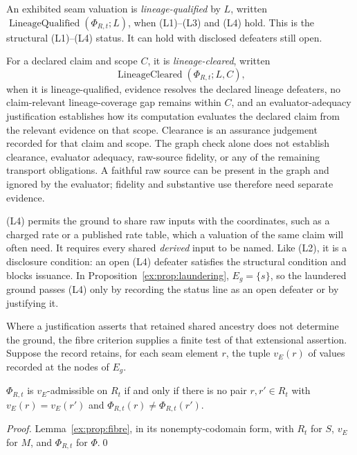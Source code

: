 \documentclass[twocolumn,envcountsect,envcountsame,natbib]{svjour3}
\begin{document}
\begin{definition}\label{ex:def:lineage-qualified}
An exhibited seam valuation is \emph{lineage-qualified} by $L$, written $\operatorname{LineageQualified}(\Phi_{R,t};L)$, when (L1)--(L3) and (L4) hold. This is the structural (L1)--(L4) status. It can hold with disclosed defeaters still open.

For a declared claim and scope $C$, it is \emph{lineage-cleared}, written
\[
\operatorname{LineageCleared}(\Phi_{R,t};L,C),
\]
when it is lineage-qualified, evidence resolves the declared lineage defeaters, no claim-relevant lineage-coverage gap remains within $C$, and an evaluator-adequacy justification establishes how its computation evaluates the declared claim from the relevant evidence on that scope. Clearance is an assurance judgement recorded for that claim and scope. The graph check alone does not establish clearance, evaluator adequacy, raw-source fidelity, or any of the remaining transport obligations. A faithful raw source can be present in the graph and ignored by the evaluator; fidelity and substantive use therefore need separate evidence.
\end{definition}

(L4) permits the ground to share raw inputs with the coordinates, such as a charged rate or a published rate table, which a valuation of the same claim will often need. It requires every shared \emph{derived} input to be named. Like (L2), it is a disclosure condition: an open (L4) defeater satisfies the structural condition and blocks issuance. In Proposition~\ref{ex:prop:laundering}, $E_g=\{s\}$, so the laundered ground passes (L4) only by recording the status line as an open defeater or by justifying it.

Where a justification asserts that retained shared ancestry does not determine the ground, the fibre criterion supplies a finite test of that extensional assertion. Suppose the record retains, for each seam element $r$, the tuple $v_E(r)$ of values recorded at the nodes of $E_g$.

\begin{proposition}\label{ex:prop:laundering-test}
$\Phi_{R,t}$ is $v_E$-admissible on $R_t$ if and only if there is no pair $r,r'\in R_t$ with $v_E(r)=v_E(r')$ and $\Phi_{R,t}(r)\neq\Phi_{R,t}(r')$.
\end{proposition}
\begin{proof}
Lemma~\ref{ex:prop:fibre}, in its nonempty-codomain form, with $R_t$ for $S$, $v_E$ for $M$, and $\Phi_{R,t}$ for $\Phi$.\qed
\end{proof}
\end{document}
